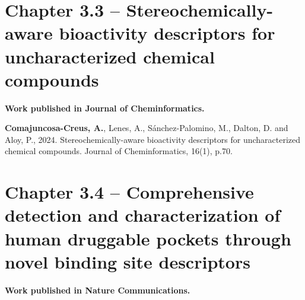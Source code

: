 





\newpage



\section[Stereochemically-aware bioactivity descriptors for uncharacterized chemical compounds]{Chapter 3.3 -- Stereochemically-aware bioactivity descriptors for uncharacterized chemical compounds}
\label{Chapter_3.3}
\setcounter{figure}{1}
\renewcommand{\thefigure}{3.\arabic{section}.\arabic{figure}}

\textbf{Work published in Journal of Cheminformatics.}

\textbf{Comajuncosa-Creus, A.}, Lenes, A., Sánchez-Palomino, M., Dalton, D. and Aloy,
P., 2024. Stereochemically-aware bioactivity descriptors for uncharacterized chemical
compounds. Journal of Cheminformatics, 16(1), p.70.







\newpage




\section[Comprehensive detection and characterization of human druggable pockets through novel binding site descriptors]{Chapter 3.4 -- Comprehensive detection and characterization of human druggable pockets through novel binding site descriptors}
\label{Chapter_3.4}
\setcounter{figure}{0}
\renewcommand{\thefigure}{3.\arabic{section}.\arabic{figure}}
\textbf{Work published in Nature Communications.}


